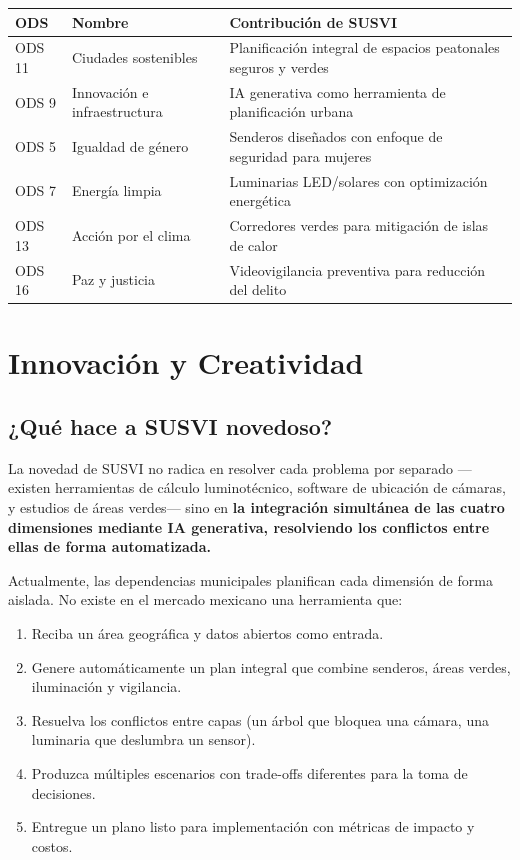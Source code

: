 \documentclass[12pt,a4paper]{article}
\begin{document}
\begin{table}[H]
\centering
\small
\begin{tabularx}{\textwidth}{l l X}
\toprule
\textbf{ODS} & \textbf{Nombre} & \textbf{Contribución de SUSVI} \\
\midrule
ODS 11 & Ciudades sostenibles & Planificación integral de espacios peatonales seguros y verdes \\
ODS 9 & Innovación e infraestructura & IA generativa como herramienta de planificación urbana \\
ODS 5 & Igualdad de género & Senderos diseñados con enfoque de seguridad para mujeres \\
ODS 7 & Energía limpia & Luminarias LED/solares con optimización energética \\
ODS 13 & Acción por el clima & Corredores verdes para mitigación de islas de calor \\
ODS 16 & Paz y justicia & Videovigilancia preventiva para reducción del delito \\
\bottomrule
\end{tabularx}
\end{table}


\section{Innovación y Creatividad}

\subsection{¿Qué hace a SUSVI novedoso?}

La novedad de SUSVI no radica en resolver cada problema por separado —existen herramientas de cálculo luminotécnico, software de ubicación de cámaras, y estudios de áreas verdes— sino en \textbf{la integración simultánea de las cuatro dimensiones mediante IA generativa, resolviendo los conflictos entre ellas de forma automatizada.}

Actualmente, las dependencias municipales planifican cada dimensión de forma aislada. No existe en el mercado mexicano una herramienta que:

\begin{enumerate}[label=\arabic*.]
    \item Reciba un área geográfica y datos abiertos como entrada.
    \item Genere automáticamente un plan integral que combine senderos, áreas verdes, iluminación y vigilancia.
    \item Resuelva los conflictos entre capas (un árbol que bloquea una cámara, una luminaria que deslumbra un sensor).
    \item Produzca múltiples escenarios con trade-offs diferentes para la toma de decisiones.
    \item Entregue un plano listo para implementación con métricas de impacto y costos.
\end{enumerate}
\end{document}
